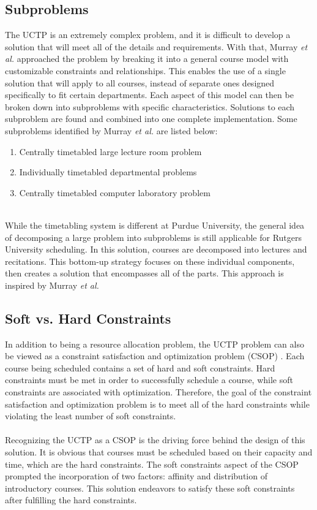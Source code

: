 \documentclass[12pt]{article}
\begin{document}
\subsection{Subproblems}
The UCTP is an extremely complex problem, and it is difficult to develop a solution that will meet all of the details and requirements. With that, Murray \emph{et al.} approached the problem by breaking it into a general course model with customizable constraints and relationships. This enables the use of a single solution that will apply to all courses, instead of separate ones designed specifically to fit certain departments. Each aspect of this model can then be broken down into subproblems with specific characteristics. Solutions to each subproblem are found and combined into one complete implementation. Some subproblems identified by Murray \emph{et al.} are listed below:

\begin{enumerate}
	\item Centrally timetabled large lecture room problem
	\item Individually timetabled departmental problems
	\item Centrally timetabled computer laboratory problem
\end{enumerate}

\hfill\\
While the timetabling system is different at Purdue University, the general idea of decomposing a large problem into subproblems is still applicable for Rutgers University scheduling. In this solution, courses are decomposed into lectures and recitations. This bottom-up strategy focuses on these individual components, then creates a solution that encompasses all of the parts. This approach is inspired by Murray \emph{et al.}

\subsection{Soft vs. Hard Constraints}
In addition to being a resource allocation problem, the UCTP problem can also be viewed as a constraint satisfaction and optimization problem (CSOP) \cite{citation1}. Each course being scheduled contains a set of hard and soft constraints. Hard constraints must be met in order to successfully schedule a course, while soft constraints are associated with optimization. Therefore, the goal of the constraint satisfaction and optimization problem is to meet all of the hard constraints while violating the least number of soft constraints.
\\\\
Recognizing the UCTP as a CSOP is the driving force behind the design of this solution. It is obvious that courses must be scheduled based on their capacity and time, which are the hard constraints. The soft constraints aspect of the CSOP prompted the incorporation of two factors: affinity and distribution of introductory courses. This solution endeavors to satisfy these soft constraints after fulfilling the hard constraints.
\end{document}
